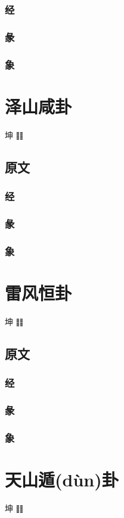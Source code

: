 \documentclass[12pt,oneside]{book}
\begin{document}
\subsection{经}
\subsection{彖}
\subsection{象}


\chapter{泽山咸卦}
坤 ䷁

\section{原文}
\subsection{经}
\subsection{彖}
\subsection{象}


\chapter{雷风恒卦}
坤 ䷁

\section{原文}
\subsection{经}
\subsection{彖}
\subsection{象}


\chapter{天山遁(dùn)卦}
坤 ䷁
\end{document}
